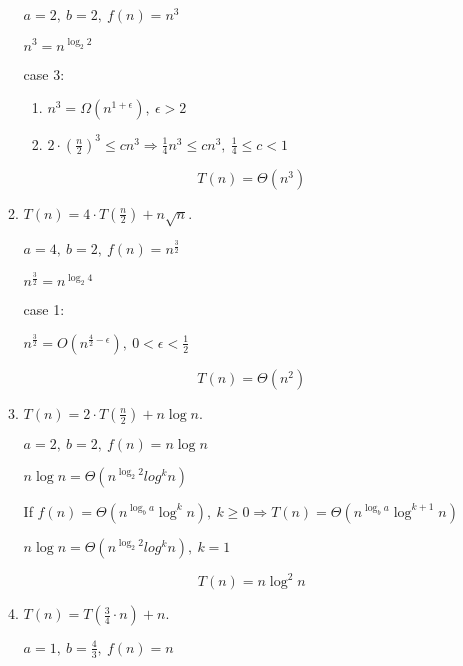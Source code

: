 \documentclass[11pt]{article}
\begin{document}
\begin{enumerate}
\begin{enumerate}
$a=2,\ b=2,\ f(n)=n^3$

$n^3 = n^{\log_2{2}}$


case 3:
\begin{enumerate}

  \item
    $n^3 = \Omega(n^{1+\epsilon}),\ \epsilon > 2$

  \item
    $2\cdot\left(\frac{n}{2}\right)^3 \leq cn^3\Rightarrow \frac{1}{4}n^3\leq cn^3 ,\ \frac{1}{4}\leq c < 1 $

\end{enumerate}

\[\boxed{T(n) = \Theta\left(n^3 \right)}\]

\item
$T(n)=4\cdot T(\frac{n}{2})+n\sqrt{n}$.

$a=4,\ b=2,\ f(n)=n^{\frac{3}{2}}$

$n^{\frac{3}{2}} = n^{\log_2 4}$

case 1:

$n^{\frac{3}{2}} = O\left(n^{\frac{4}{2}-\epsilon}\right),\ 0 < \epsilon < \frac{1}{2}$

\[\boxed{T(n) = \Theta\left(n^2 \right)}\]


\item
$T(n)=2\cdot T(\frac{n}{2})+n\log n$.

$a=2,\ b=2,\ f(n)=n\log n$

$n\log n = \Theta(n^{\log_2 2} log^k n)$

If $f(n)=\Theta (n^{\log_{b}a}\log^{k}n),\ k \geq 0 \Rightarrow T(n)=\Theta (n^{\log_{b}a}\log^{k+1}n)$

$n\log n = \Theta(n^{\log_2 2} log^k n),\ k=1$

\[\boxed{T(n)=n\log^2 n}\]

%
%
%
%
%
%
%
%

\item
$T(n)=T(\frac{3}{4}\cdot n)+n$.

$a=1,\ b=\frac{4}{3},\ f(n) = n$


\end{enumerate}
\end{enumerate}
\end{document}
